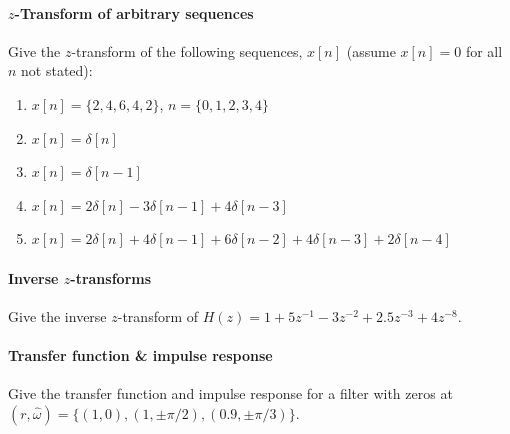 \paragraph{$z$-Transform of arbitrary sequences}
Give the $z$-transform of the following sequences, $x[n]$ (assume
$x[n]=0$ for all $n$ not stated):
\begin{enumerate}
\item $x[n]=\{2, 4, 6, 4, 2\}$, $n = \{0, 1, 2, 3, 4\}$

\item $x[n] = \delta[n]$

\item $x[n] = \delta[n-1]$

\item $x[n] = 2\delta[n] - 3\delta[n-1] +4\delta[n-3]$

\item $x[n] = 2\delta[n] + 4\delta[n-1] + 6\delta[n-2] + 4\delta[n-3] + 2\delta[n-4]$
\end{enumerate}


\paragraph{Inverse $z$-transforms}
Give the inverse $z$-transform of $H(z) = 1 + 5z^{-1} - 3z^{-2} +
2.5z^{-3} +4z^{-8}$.

\paragraph{Transfer function \& impulse response}
Give the transfer function and impulse response for a filter with
zeros at $(r, \hat{\omega}) = \{(1, 0), (1, \pm \pi/2), (0.9, \pm
\pi/3)\}$.

